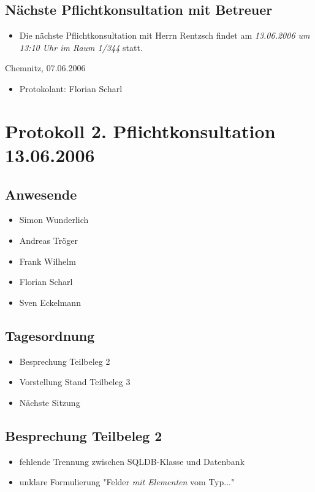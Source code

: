 			\subsection{Nächste Pflichtkonsultation mit Betreuer}
			\begin{itemize}
			\item Die nächste Pflichtkonsultation mit Herrn Rentzsch findet am {\em 13.06.2006 um 13:10 Uhr im Raum 			1/344 } statt.
			\end{itemize}
			Chemnitz, 07.06.2006
			\begin{itemize}
				\item Protokolant: Florian Scharl
			\end{itemize}
\newpage
		\section{Protokoll 2. Pflichtkonsultation 13.06.2006}
		\subsection{Anwesende}
		\begin{itemize}
			\item Simon Wunderlich
			\item Andreas Tröger
			\item Frank Wilhelm
			\item Florian Scharl
			\item Sven Eckelmann
		\end{itemize}
		\subsection{Tagesordnung}
		\begin{itemize}
			\item Besprechung Teilbeleg 2
			\item Vorstellung Stand Teilbeleg 3
			\item Nächste Sitzung
		\end{itemize}
			\subsection{Besprechung Teilbeleg 2}
			\begin{itemize}
				\item fehlende Trennung zwischen SQLDB-Klasse und Datenbank
				\item unklare Formulierung "Felder {\it mit Elementen} vom Typ..."
			\end{itemize}
